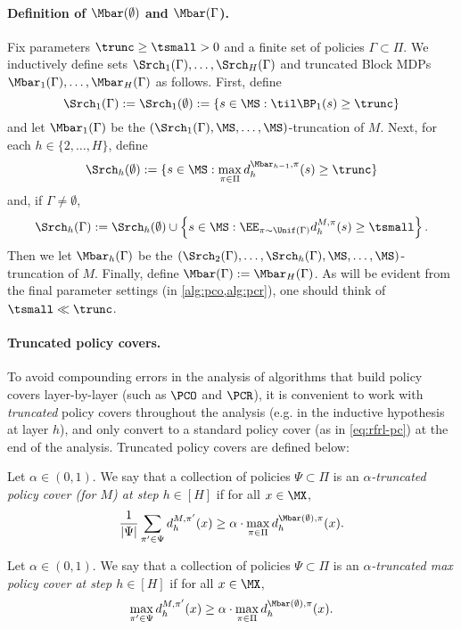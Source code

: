 \paragraph{Definition of $\Mbar(\emptyset)$ and $\Mbar(\Gamma$).} Fix parameters $\trunc \geq \tsmall > 0$ and a finite set of policies $\Gamma \subset \Pi$. We inductively define sets $\Srch_1(\Gamma),\dots,\Srch_H(\Gamma)$ and truncated Block MDPs $\Mbar_1(\Gamma),\dots,\Mbar_H(\Gamma)$ as follows. First, define 
\[\Srch_1(\Gamma) := \Srch_1(\emptyset) := \{s \in \MS: \til\BP_1(s) \geq \trunc\}\]
and let $\Mbar_1(\Gamma)$ be the $(\Srch_1(\Gamma),\MS,\dots,\MS)$-truncation of $M$. Next, for each $h \in \{2,\dots,H\}$, define \[\Srch_h(\emptyset) := \{s \in \MS: \max_{\pi\in\Pi} d^{\Mbar_{h-1}, \pi}_h(s) \geq \trunc\}\]
and, if $\Gamma \neq \emptyset$, \[\Srch_h(\Gamma) := \Srch_h(\emptyset) \cup \left\{s \in \MS: \EE_{\pi\sim\Unif(\Gamma)} d^{M,\pi}_h(s) \geq \tsmall\right\}.\]
Then we let $\Mbar_h(\Gamma)$ be the $(\Srch_2(\Gamma),\dots,\Srch_h(\Gamma),\MS,\dots,\MS)$-truncation of $M$. Finally, define $\Mbar(\Gamma) := \Mbar_H(\Gamma)$. As will be evident from the final parameter settings (in \cref{alg:pco,alg:pcr}), one should think of $\tsmall \ll \trunc$.

\paragraph{Truncated policy covers.} To avoid compounding errors in the analysis of algorithms that build policy covers layer-by-layer (such as $\PCO$ and $\PCR$), it is convenient to work with \emph{truncated} policy covers throughout the analysis (e.g. in the inductive hypothesis at layer $h$), and only convert to a standard policy cover (as in \cref{eq:rfrl-pc}) at the end of the analysis. Truncated policy covers are defined below:

\begin{definition}\label{defn:trunc-pc}
Let $\alpha \in (0,1)$. We say that a collection of policies $\Psi \subset \Pi$ is an \emph{$\alpha$-truncated policy cover (for $M$) at step $h\in [H]$} if for all $x \in \MX$,
\begin{align}
\frac{1}{|\Psi|} \sum_{\pi' \in \Psi} d_h^{M,\pi'}(x) \geq \alpha \cdot \max_{\pi \in \Pi} d_h^{\Mbar(\emptyset),\pi}(x)\label{eq:approx-pc}. 
\end{align}
\end{definition}
\begin{definition}\label{defn:trunc-max-pc}
Let $\alpha \in (0,1)$. We say that a collection of policies $\Psi \subset \Pi$ is an \emph{$\alpha$-truncated max policy cover at step $h\in [H]$} if for all $x \in \MX$,
\begin{align}
\max_{\pi'\in\Psi} d_h^{M,\pi'}(x) \geq \alpha \cdot \max_{\pi \in \Pi} d_h^{\Mbar(\emptyset),\pi}(x) \label{eq:approx-max-pc}.
\end{align}
\end{definition}

